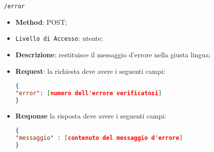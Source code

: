 	\item \texttt{/error}
		\begin{itemize}
			\item \textbf{Method}: POST;
			\item \texttt{Livello di Accesso}: utente;
			\item \textbf{Descrizione}: restituisce il messaggio d'errore nella giusta lingua;
			\item \textbf{Request}: la richiesta deve avere i seguenti campi:
\begin{lstlisting}[language=json,firstnumber=1]
{
"error": [numero dell'errore verificatosi]
}
\end{lstlisting}
			\item \textbf{Response} la risposta deve avere i seguenti campi:
\begin{lstlisting}[language=json,firstnumber=1]
{
"messaggio" : [contenuto del messaggio d'errore]
}
\end{lstlisting}
		\end{itemize}